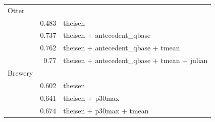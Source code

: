 \documentclass[12pt]{article}
\begin{document}
\begin{table}[h]
\begin{center}
\begin{tabular}{lrl}
    Otter & & \\
    & 0.483 & theisen\\
    & 0.737 & theisen + antecedent\_qbase\\
    & 0.762 & theisen + antecedent\_qbase + tmean\\
    & 0.77 & theisen + antecedent\_qbase + tmean + julian\\

    Brewery & & \\
    & 0.602 & theisen\\
    & 0.641 & theisen + p30max\\
    & 0.674 & theisen + p30max + tmean\\

    \end{tabular}
    \end{center}
\end{table}
\end{document}
